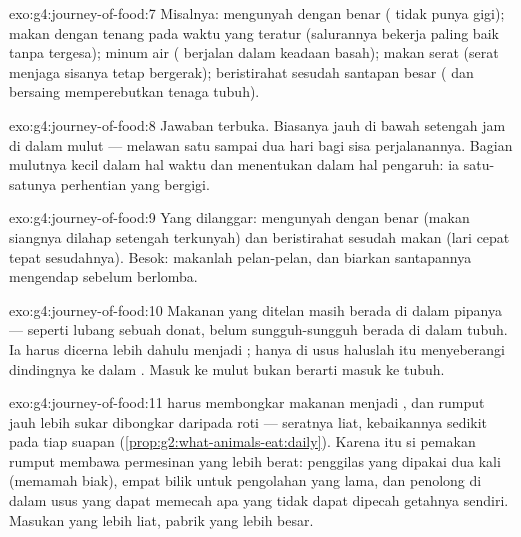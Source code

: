 \begin{solution}{exo:g4:journey-of-food:7}
Misalnya: mengunyah dengan benar ( tidak punya gigi); makan
dengan tenang pada waktu yang teratur (salurannya bekerja paling baik
tanpa tergesa); minum air ( berjalan dalam keadaan basah);
makan serat (serat menjaga sisanya tetap bergerak); beristirahat
sesudah santapan besar ( dan  bersaing memperebutkan
tenaga tubuh).
\end{solution}

\begin{solution}{exo:g4:journey-of-food:8}
Jawaban terbuka. Biasanya jauh di bawah setengah jam di dalam mulut
--- melawan satu sampai dua hari bagi sisa perjalanannya. Bagian
mulutnya kecil dalam hal waktu dan menentukan dalam hal pengaruh: ia
satu-satunya perhentian yang bergigi.
\end{solution}

\begin{solution}{exo:g4:journey-of-food:9}
Yang dilanggar: mengunyah dengan benar (makan siangnya dilahap
setengah terkunyah) dan beristirahat sesudah makan (lari cepat tepat
sesudahnya). Besok: makanlah pelan-pelan, dan biarkan santapannya
mengendap sebelum berlomba.
\end{solution}

\begin{solution}{exo:g4:journey-of-food:10}
Makanan yang ditelan masih berada di dalam pipanya --- seperti lubang
sebuah donat, belum sungguh-sungguh berada di dalam tubuh. Ia harus
dicerna lebih dahulu menjadi ; hanya di usus haluslah 
itu menyeberangi dindingnya ke dalam . Masuk ke mulut bukan
berarti masuk ke tubuh.
\end{solution}

\begin{solution}{exo:g4:journey-of-food:11}
 harus membongkar makanan menjadi , dan rumput jauh
lebih sukar dibongkar daripada roti --- seratnya liat, kebaikannya
sedikit pada tiap suapan
(\cref{prop:g2:what-animals-eat:daily}). Karena itu si pemakan rumput
membawa permesinan yang lebih berat:  penggilas yang
dipakai dua kali (memamah biak), empat bilik  untuk pengolahan
yang lama, dan penolong di dalam usus yang dapat memecah apa yang
tidak dapat dipecah getahnya sendiri. Masukan yang lebih liat, pabrik
yang lebih besar.
\end{solution}
